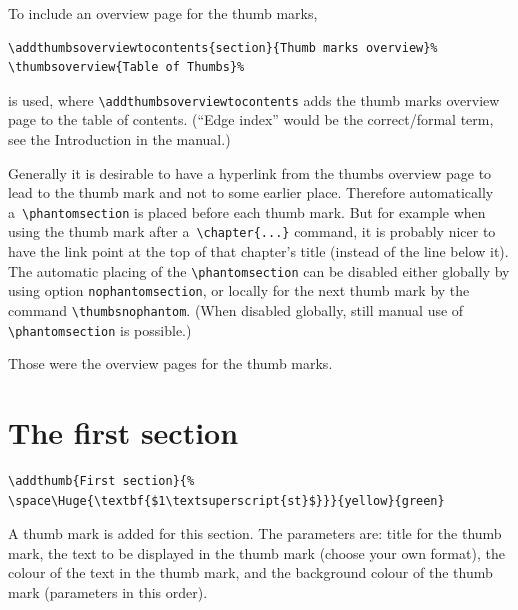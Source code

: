 \documentclass[a4paper,twoside,british]{article}[2025/01/22]%
\begin{document}
To include an overview page for the thumb marks,
\begin{verbatim}
\addthumbsoverviewtocontents{section}{Thumb marks overview}%
\thumbsoverview{Table of Thumbs}%
\end{verbatim}
is used, where \verb|\addthumbsoverviewtocontents| adds the thumb marks overview page to the table of contents.
(\textquotedblleft Edge index\textquotedblright{} would be the correct/{}formal term, see the Introduction in the manual.)
\smallskip

Generally it is desirable to have a hyperlink from the thumbs overview page to lead to the thumb mark
and not to some earlier place. Therefore automatically a~\verb|\phantomsection| is placed before each thumb mark.
But for example when using the thumb mark after a~\verb|\chapter{...}| command, it is probably nicer to have
the link point at the top of that chapter's title (instead of the line below it). The automatic placing of the
\verb|\phantomsection| can be disabled either globally by using option \texttt{nophantomsection},
or locally for the next thumb mark by the command \verb|\thumbsnophantom|. (When disabled globally,
still manual use of \verb|\phantomsection| is possible.)

%
%

\noindent Those were the overview pages for the thumb marks.
\newpage

\section{The first section}

\begin{verbatim}
\addthumb{First section}{%
\space\Huge{\textbf{$1\textsuperscript{st}$}}}{yellow}{green}
\end{verbatim}

A thumb mark is added for this section. The parameters are: title for the thumb mark,
the text to be displayed in the thumb mark (choose your own format),
the colour of the text in the thumb mark,
and the background colour of the thumb mark (parameters in this order).\newline
\end{document}
